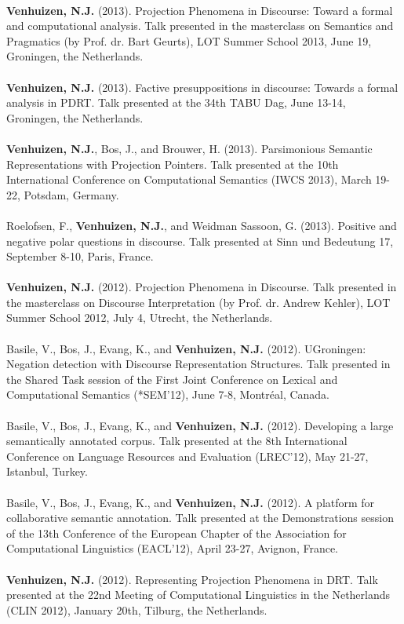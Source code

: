 \documentclass[a4paper,10pt]{article}
\begin{document}
    \\
    \textbf{Venhuizen, N.J.} (2013). Projection Phenomena in Discourse: Toward
    a formal and computational analysis. Talk
    presented in the masterclass on Semantics and Pragmatics (by Prof. dr. Bart
    Geurts), LOT Summer School 2013, June 19, Groningen, the Netherlands.\\
    \\
    \textbf{Venhuizen, N.J.} (2013). Factive presuppositions in discourse:
    Towards a formal analysis in PDRT. Talk presented at the 34th TABU Dag,
    June 13-14, Groningen, the Netherlands.\\
    \\
    \textbf{Venhuizen, N.J.}, Bos, J., and Brouwer, H. (2013). Parsimonious 
    Semantic Representations with Projection Pointers. Talk presented at
    the 10th International Conference on Computational Semantics (IWCS 2013),
    March 19-22, Potsdam, Germany.\\
    \\
    Roelofsen, F., \textbf{Venhuizen, N.J.}, and Weidman Sassoon, G. (2013).
    Positive and negative polar questions in discourse. Talk presented at
    Sinn und Bedeutung 17, September 8-10, Paris, France.\\
    \\
    \textbf{Venhuizen, N.J.} (2012). Projection Phenomena in Discourse. Talk
    presented in the masterclass on Discourse Interpretation (by Prof. dr.
    Andrew Kehler), LOT Summer School 2012, July 4, Utrecht, the Netherlands.\\
    \\
    Basile, V., Bos, J., Evang, K., and \textbf{Venhuizen, N.J.} (2012).
    UGroningen: Negation detection with Discourse Representation Structures.
    Talk presented in the Shared Task session of the First Joint Conference
    on Lexical and Computational Semantics (*SEM'12), June 7-8, Montr{\'e}al,
    Canada.\\
    \\
    Basile, V., Bos, J., Evang, K., and \textbf{Venhuizen, N.J.} (2012).
    Developing a large semantically annotated corpus. Talk presented at the
    8th International Conference on Language Resources and Evaluation
    (LREC'12), May 21-27, Istanbul, Turkey.\\
    \\
    Basile, V., Bos, J., Evang, K., and \textbf{Venhuizen, N.J.} (2012).
    A platform for collaborative semantic annotation. Talk presented at the
    Demonstrations session of the 13th Conference of the European Chapter of
    the Association for Computational Linguistics (EACL'12), April 23-27,
    Avignon, France.\\
    \\
    \textbf{Venhuizen, N.J.} (2012). Representing Projection Phenomena in
    DRT. Talk presented at the 22nd Meeting of Computational Linguistics in
    the Netherlands (CLIN 2012), January 20th, Tilburg, the Netherlands.
\end{document}
